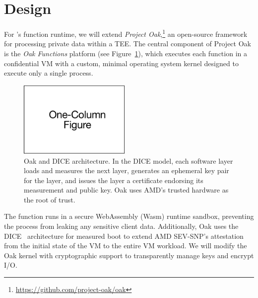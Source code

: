 \section{Design}
\label{sec:design}


%
For \SystemName's function runtime, we will extend \emph{Project Oak},\footnote{
\url{https://github.com/project-oak/oak}
}
an open-source framework for processing private data within a TEE\@.
%
The central component of Project Oak is the \emph{Oak Functions} platform (see
Figure~\ref{fig:oak}), which executes each function in a confidential VM with a
custom, minimal operating system kernel designed to execute only a single
process.
%
\begin{figure}
    \centering
    \includegraphics[page = 3, width=0.48\textwidth]{diagrams/slides.pdf}
    \caption{Oak and DICE architecture.
    In the DICE model, each software layer loads and measures the next layer,
    generates an ephemeral key pair for the layer, and issues the layer a
    certificate endorsing its measurement and public key.
    Oak uses AMD's trusted hardware as the root of trust.
    }
    \label{fig:oak}
\end{figure}
%
The function runs in a secure WebAssembly (Wasm) runtime sandbox, preventing
the process from leaking any sensitive client data.
%
Additionally, Oak uses the DICE~\cite{24-misc-dice} architecture for measured
boot to extend AMD SEV-SNP's attestation from the initial state of the VM
to the entire VM workload.
%
We will modify the Oak kernel with cryptographic support to transparently
manage keys and encrypt I/O\@.



